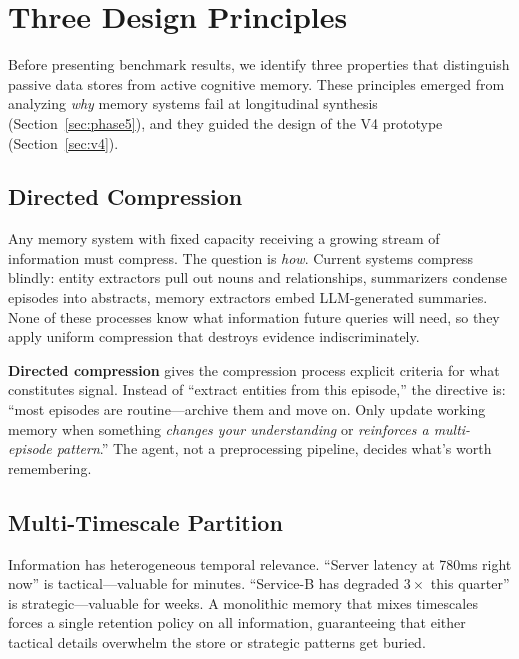 \documentclass[11pt,letterpaper]{article}
\begin{document}
\section{Three Design Principles}
\label{sec:principles}

Before presenting benchmark results, we identify three properties that distinguish passive data stores from active cognitive memory. These principles emerged from analyzing \emph{why} memory systems fail at longitudinal synthesis (Section~\ref{sec:phase5}), and they guided the design of the V4 prototype (Section~\ref{sec:v4}).

\subsection{Directed Compression}

Any memory system with fixed capacity receiving a growing stream of information must compress. The question is \emph{how}. Current systems compress blindly: entity extractors pull out nouns and relationships, summarizers condense episodes into abstracts, memory extractors embed LLM-generated summaries. None of these processes know what information future queries will need, so they apply uniform compression that destroys evidence indiscriminately.

\textbf{Directed compression} gives the compression process explicit criteria for what constitutes signal. Instead of ``extract entities from this episode,'' the directive is: ``most episodes are routine---archive them and move on. Only update working memory when something \emph{changes your understanding} or \emph{reinforces a multi-episode pattern}.'' The agent, not a preprocessing pipeline, decides what's worth remembering.

\subsection{Multi-Timescale Partition}

Information has heterogeneous temporal relevance. ``Server latency at 780ms right now'' is tactical---valuable for minutes. ``Service-B has degraded $3\times$ this quarter'' is strategic---valuable for weeks. A monolithic memory that mixes timescales forces a single retention policy on all information, guaranteeing that either tactical details overwhelm the store or strategic patterns get buried.
\end{document}
